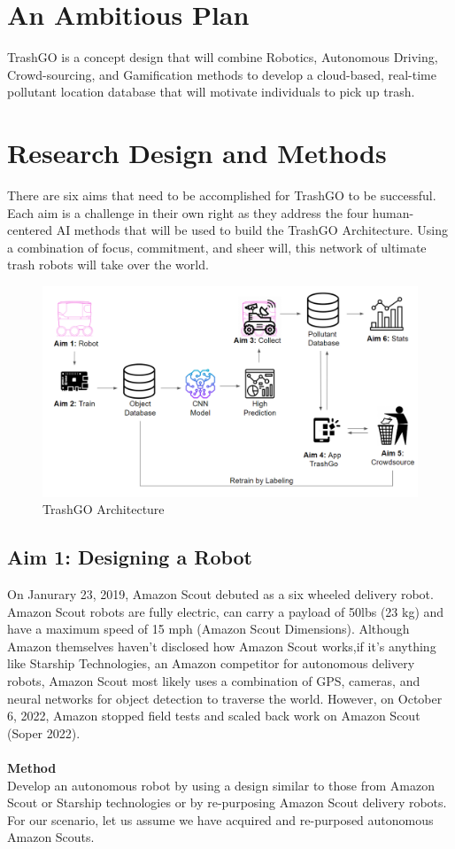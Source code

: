 \documentclass[
  journal=small,
  manuscript=article-type,  %
  year=2022,
  volume=1,
]{cup-journal}
\begin{document}
\section{An Ambitious Plan}
TrashGO is a concept design that will combine Robotics, Autonomous Driving, Crowd-sourcing, and Gamification methods to develop a cloud-based, real-time pollutant location database that will motivate individuals to pick up trash.

\section{Research Design and Methods}
There are six aims that need to be accomplished for TrashGO to be successful. Each aim is a challenge in their own right as they address the four human-centered AI methods that will be used to build the TrashGO Architecture. Using a combination of focus, commitment, and sheer will, this network of ultimate trash robots will take over the world.

\begin{figure}[h!]
    \hspace*{-.75cm}
    \includegraphics[scale = .4]{aims.png}
    \caption{TrashGO Architecture}
    \label{trash_architecture}
\end{figure}
\vspace*{-2.0em}
\subsection{Aim 1: Designing a Robot}

On Janurary 23, 2019, Amazon Scout debuted as a six wheeled delivery robot. Amazon Scout robots are fully electric, can carry a payload of 50lbs (23 kg) and have a maximum speed of 15 mph (Amazon Scout Dimensions). Although Amazon themselves haven't disclosed how Amazon Scout works,if it's anything like Starship Technologies, an Amazon competitor for autonomous delivery robots, Amazon Scout most likely uses a combination of GPS, cameras, and neural networks for object detection to traverse the world. However, on October 6, 2022, Amazon stopped field tests and scaled back work on Amazon Scout (Soper 2022).
\\\\\textbf{Method}\\
Develop an autonomous robot by using a design similar to those from Amazon Scout or Starship technologies or by re-purposing Amazon Scout delivery robots. For our scenario, let us assume we have acquired and re-purposed autonomous Amazon Scouts. 
\end{document}
